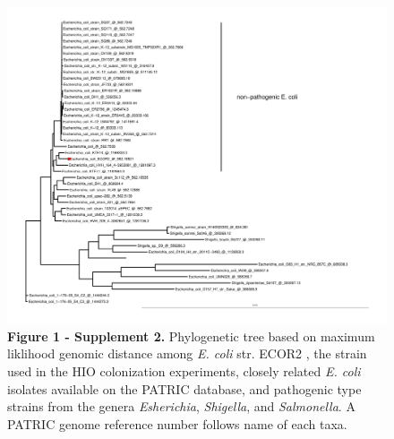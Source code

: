 \documentclass[9pt,lineo]{elife}
\begin{document}
\begin{figure}
\begin{fullwidth} \centering\includegraphics[width=0.9\linewidth]{./figures/figure1/sfigure1-2_tree.pdf}
\caption*{\textbf{Figure 1 - Supplement 2. } Phylogenetic tree based on maximum liklihood genomic distance among \textit{E. coli} str. ECOR2 \citep{Ochman:1984}, the strain used in the HIO colonization experiments, closely related \textit{E. coli} isolates available on the PATRIC \citep{Wattam:2017} database, and pathogenic type strains from the genera \textit{Esherichia}, \textit{Shigella}, and \textit{Salmonella}. A PATRIC genome reference number follows name of each taxa.}
\label{fig:fullwidth}
\end{fullwidth}
\end{figure}
\end{document}
